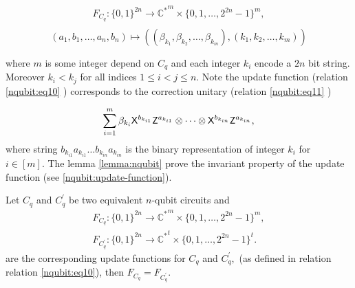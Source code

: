 \begin{equation}
\label{nqubit:eq10}
\begin{aligned}
F_{C_q}: \{0,1\}^{2n}\longrightarrow {\mathbb{C}^*}^m\times \{0,1,\ldots,2^{2n}-1\}^m, \\
\end{aligned}
\end{equation}
$$(a_1,b_1,\ldots, a_n,b_n) \mapsto ((\beta_{k_1}, \beta_{k_2},\ldots, \beta_{k_m}),(k_1,k_2,\ldots, k_m))$$

where $m$ is some integer depend on $C_q$ and each integer $k_i$ encode a $2n$ bit string. Moreover  $k_i< k_j$ for all indices $1 \leq i<j \leq n.$ Note  the update function (relation \ref{nqubit:eq10} ) corresponds to the correction unitary (relation  \ref{nqubit:eq11} )

\begin{equation}
\label{nqubit:eq11}
\begin{aligned}
\sum_{i=1}^m \beta_{k_i} {\sf X}^{b_{k_{i1}}} {\sf Z}^{a_{k_{i1}}} \otimes \cdots  \otimes {\sf X}^{b_{k_{in}}} {\sf Z}^{a_{k_{in}}},
\end{aligned}
\end{equation}
where string $b_{k_{i1}} a_{k_{i1}}\ldots b_{k_{in}} a_{k_{in}}$ is the binary representation of integer $k_i$ for $i\in[m].$ The lemma \ref{lemma:nqubit} prove the invariant property of the update function (see \ref{nqubit:update-function}).


\begin{lemma}
\label{lemma:nqubit}
Let $C_q$ and $C_q^\prime$ be two equivalent $n$-qubit circuits and 
\begin{equation*}
\begin{aligned}
F_{C_q}: \{0,1\}^{2n}\longrightarrow {\mathbb{C}^*}^m\times \{0,1,\ldots,2^{2n}-1\}^m,  \\
F_{C_q^\prime}: \{0,1\}^{2n}\longrightarrow {\mathbb{C}^*}^{t}\times \{0,1,\ldots,2^{2n}-1\}^{t}. 
\end{aligned}
\end{equation*}
are the corresponding update functions for $C_q$ and $C_q^\prime,$  (as defined in relation relation \ref{nqubit:eq10}), then $F_{C_q}=F_{C_q^\prime}.$
\end{lemma}

